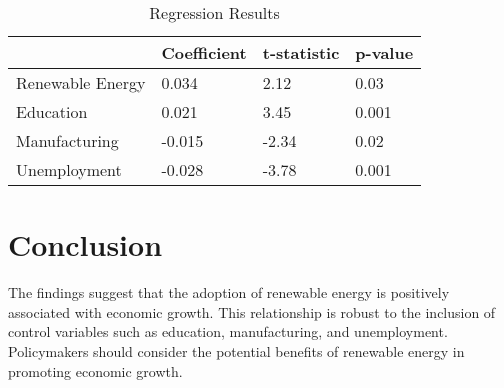 \documentclass[12pt]{article}
\begin{document}
\begin{table}[ht]
\centering
\caption{Regression Results}
\label{tab:results}
\begin{tabular}{@{}llll@{}}
\toprule
& \textbf{Coefficient} & \textbf{t-statistic} & \textbf{p-value} \\ \midrule
Renewable Energy & 0.034 & 2.12 & 0.03 \\
Education & 0.021 & 3.45 & 0.001 \\
Manufacturing & -0.015 & -2.34 & 0.02 \\
Unemployment & -0.028 & -3.78 & 0.001 \\ \bottomrule
\end{tabular}
\end{table}

\section{Conclusion}

The findings suggest that the adoption of renewable energy is positively associated with economic growth. This relationship is robust to the inclusion of control variables such as education, manufacturing, and unemployment. Policymakers should consider the potential benefits of renewable energy in promoting economic growth.
\end{document}
